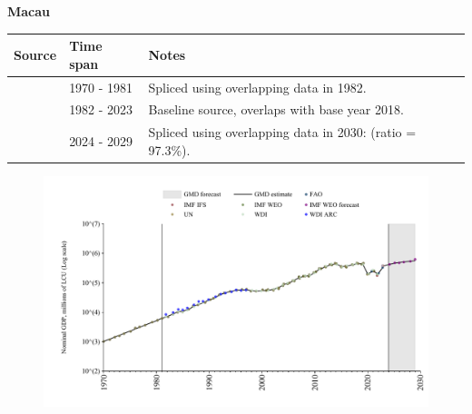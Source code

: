 \documentclass[12pt,a4paper,landscape]{article}
\begin{document}
\begin{adjustbox}{max totalsize={\paperwidth}{\paperheight},center}
\begin{minipage}[t][\textheight][t]{\textwidth}
\vspace*{0.5cm}
{}
\begin{center}
{\Large\bfseries Macau}
\end{center}
\vspace{0.5cm}
\begin{table}[H]
\centering
\small
\begin{tabular}{|l|l|l|}
\hline
\textbf{Source} & \textbf{Time span} & \textbf{Notes} \\
\hline
\rowcolor{white}\cite{UN}& 1970 - 1981 &Spliced using overlapping data in 1982.\\
\rowcolor{lightgray}\cite{WDI}& 1982 - 2023 &Baseline source, overlaps with base year 2018.\\
\rowcolor{white}\cite{IMF_WEO_forecast}& 2024 - 2029 &Spliced using overlapping data in 2030: (ratio = 97.3\%).\\
\hline
\end{tabular}
\end{table}
\begin{figure}[H]
\centering
\includegraphics[width=\textwidth,height=0.6\textheight,keepaspectratio]{graphs/MAC_nGDP.pdf}
\end{figure}
\end{minipage}
\end{adjustbox}
\end{document}
